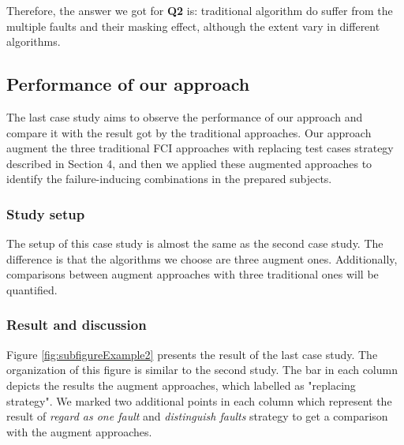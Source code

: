 \documentclass{sig-alternate}
\begin{document}
%

Therefore, the answer we got for \textbf{Q2} is: traditional algorithm do suffer from the multiple faults and their masking effect, although the extent vary in different algorithms.

\subsection{Performance of our approach}
The last case study aims to observe the performance of our approach and compare it with the result got by the traditional approaches. Our approach augment the three traditional FCI approaches with replacing test cases strategy described in Section 4, and then we applied these augmented approaches to identify the failure-inducing combinations in the prepared subjects.

\subsubsection{Study setup}
The setup of this case study is almost the same as the second case study. The difference is that the algorithms we choose are three augment ones. Additionally, comparisons between augment approaches with three traditional ones will be quantified.

\subsubsection{Result and discussion}
Figure \ref{fig:subfigureExample2} presents the result of the last case study. The organization of this figure is similar to the second study. The bar in each column depicts the results the augment approaches, which labelled as "replacing strategy". We marked two additional points in each column which represent the result of \emph{regard as one fault} and \emph{distinguish faults} strategy to get a comparison with the augment approaches.

\end{document}
